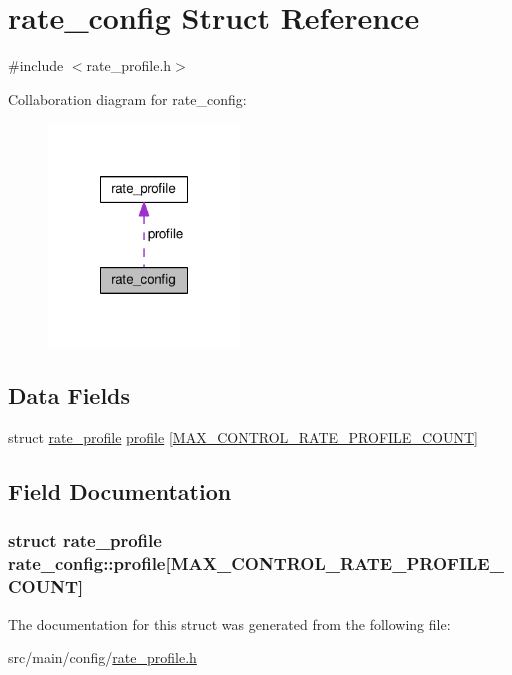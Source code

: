 \hypertarget{structrate__config}{\section{rate\+\_\+config Struct Reference}
\label{structrate__config}
}


{\ttfamily \#include $<$rate\+\_\+profile.\+h$>$}



Collaboration diagram for rate\+\_\+config\+:\nopagebreak
\begin{figure}[H]
\begin{center}
\leavevmode
\includegraphics[width=144pt]{structrate__config__coll__graph}
\end{center}
\end{figure}
\subsection*{Data Fields}
\begin{DoxyCompactItemize}
\item 
struct \hyperlink{structrate__profile}{rate\+\_\+profile} \hyperlink{structrate__config_a15793e8304482ae9e96163d6466fc1dc}{profile} \mbox{[}\hyperlink{config_2rate__profile_8h_a5b2793c924d7a835672168e714721c25}{M\+A\+X\+\_\+\+C\+O\+N\+T\+R\+O\+L\+\_\+\+R\+A\+T\+E\+\_\+\+P\+R\+O\+F\+I\+L\+E\+\_\+\+C\+O\+U\+N\+T}\mbox{]}
\end{DoxyCompactItemize}


\subsection{Field Documentation}
\hypertarget{structrate__config_a15793e8304482ae9e96163d6466fc1dc}{
\subsubsection[{profile}]{\setlength{\rightskip}{0pt plus 5cm}struct {\bf rate\+\_\+profile} rate\+\_\+config\+::profile\mbox{[}{\bf M\+A\+X\+\_\+\+C\+O\+N\+T\+R\+O\+L\+\_\+\+R\+A\+T\+E\+\_\+\+P\+R\+O\+F\+I\+L\+E\+\_\+\+C\+O\+U\+N\+T}\mbox{]}}}\label{structrate__config_a15793e8304482ae9e96163d6466fc1dc}


The documentation for this struct was generated from the following file\+:\begin{DoxyCompactItemize}
\item 
src/main/config/\hyperlink{config_2rate__profile_8h}{rate\+\_\+profile.\+h}\end{DoxyCompactItemize}
